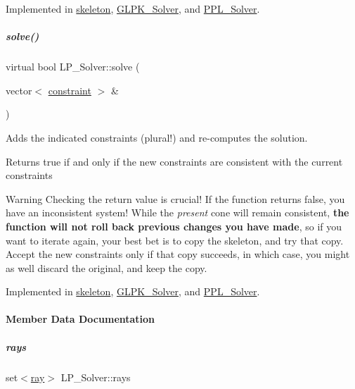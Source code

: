 Implemented in \hyperlink{group___c_l_s_solvers_a8add1433d3bc6b1a8588f0f88134599f}{skeleton}, \hyperlink{group___c_l_s_solvers_acb3a10f3961c65b4cf23ff61f0e2310b}{G\+L\+P\+K\+\_\+\+Solver}, and \hyperlink{group___c_l_s_solvers_a1ff16def22c734348c626b65437dd1e3}{P\+P\+L\+\_\+\+Solver}.

\mbox{\label{group___c_l_s_solvers_a35da4bdf5db971c445f495b6eaab072d}} 
\subparagraph{\texorpdfstring{solve()}{solve()}\hspace{0.1cm}{\footnotesize\ttfamily [2/2]}}
{\footnotesize\ttfamily virtual bool L\+P\+\_\+\+Solver\+::solve (\begin{DoxyParamCaption}\item[{vector$<$ \hyperlink{group___c_l_s_solvers_classconstraint}{constraint} $>$ \&}]{ }\end{DoxyParamCaption})\hspace{0.3cm}{\ttfamily [pure virtual]}}



Adds the indicated constraints (plural!) and re-\/computes the solution. 

\begin{DoxyReturn}{Returns}
{\ttfamily true} if and only if the new constraints are consistent with the current constraints
\end{DoxyReturn}
\begin{DoxyWarning}{Warning}
Checking the return value is crucial! If the function returns {\ttfamily false}, you have an inconsistent system! While the {\itshape present} cone will remain consistent, {\bfseries the function will not roll back previous changes you have made}, so if you want to iterate again, your best bet is to copy the skeleton, and try that copy. Accept the new constraints only if that copy succeeds, in which case, you might as well discard the original, and keep the copy. 
\end{DoxyWarning}


Implemented in \hyperlink{group___c_l_s_solvers_ac366952c2b0908159255916a1e37f9b3}{skeleton}, \hyperlink{group___c_l_s_solvers_a6d800f0ec270c782e3cf855aa7f59f4c}{G\+L\+P\+K\+\_\+\+Solver}, and \hyperlink{group___c_l_s_solvers_a5000b8c5bee37029276ce63a3568bfb7}{P\+P\+L\+\_\+\+Solver}.



\paragraph{Member Data Documentation}
\mbox{\label{group___c_l_s_solvers_aa89c9167eb3ef921b57d74057217f407}} 
\subparagraph{\texorpdfstring{rays}{rays}}
{\footnotesize\ttfamily set$<$\hyperlink{group___c_l_s_solvers_classray}{ray}$>$ L\+P\+\_\+\+Solver\+::rays\hspace{0.3cm}{\ttfamily [protected]}}

